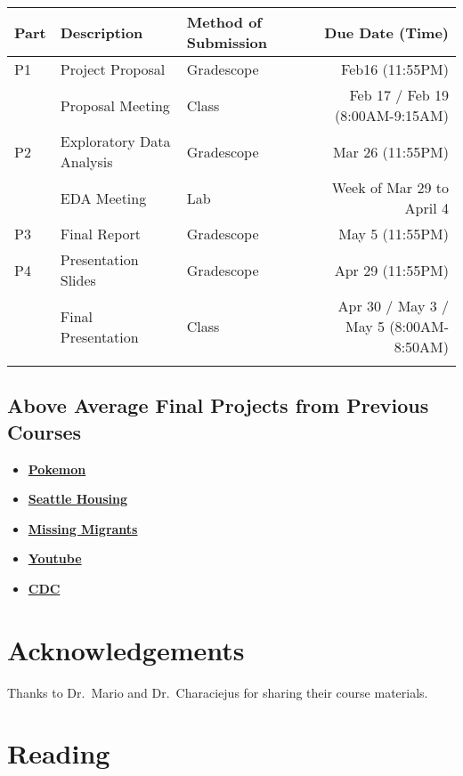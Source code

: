 \documentclass[
]{article}
\providecommand{\tightlist}{%
  \setlength{\itemsep}{0pt}\setlength{\parskip}{0pt}}
\begin{document}
\begin{longtable}[]{@{}lllr@{}}
\toprule
Part & Description & Method of Submission & Due Date
(Time)\tabularnewline
\midrule
\endhead
P1 & Project Proposal & Gradescope & Feb16 (11:55PM)\tabularnewline
& Proposal Meeting & Class & Feb 17 / Feb 19
(8:00AM-9:15AM)\tabularnewline
P2 & Exploratory Data Analysis & Gradescope & Mar 26
(11:55PM)\tabularnewline
& EDA Meeting & Lab & Week of Mar 29 to April 4\tabularnewline
P3 & Final Report & Gradescope & May 5 (11:55PM)\tabularnewline
P4 & Presentation Slides & Gradescope & Apr 29 (11:55PM)\tabularnewline
& Final Presentation & Class & Apr 30 / May 3 / May 5
(8:00AM-8:50AM)\tabularnewline
& & &\tabularnewline
\bottomrule
\end{longtable}

\hypertarget{above-average-final-projects-from-previous-courses}{%
\subsection{Above Average Final Projects from Previous
Courses}\label{above-average-final-projects-from-previous-courses}}

\begin{itemize}
\tightlist
\item
  \textbf{\href{Final\%20Project/SP2019_EX1.html}{Pokemon}}
\item
  \textbf{\href{Final\%20Project/SP2019_EX2.html}{Seattle Housing}}
\item
  \textbf{\href{Final\%20Project/SU2019_EX1.html}{Missing Migrants}}
\item
  \textbf{\href{Final\%20Project/FA2019_EX1.html}{Youtube}}
\item
  \textbf{\href{Final\%20Project/FA2019_EX2.html}{CDC}}
\end{itemize}

\hypertarget{acknowledgements}{%
\section{\texorpdfstring{\textbf{Acknowledgements}}{Acknowledgements}}\label{acknowledgements}}

Thanks to Dr.~Mario and Dr.~Characiejus for sharing their course
materials.

\hypertarget{reading}{%
\section{\texorpdfstring{\textbf{Reading}}{Reading}}\label{reading}}
\end{document}
